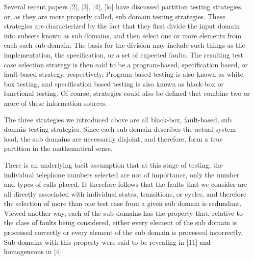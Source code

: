\documentclass[journal, twoside]{IEEEtran}
\begin{document}
Several recent papers [2], [3], [4], [lo] have discussed
partition testing strategies, or, as they are more properly
called, sub domain testing strategies. These strategies are characterized by the fact that they first divide the input domain into
subsets known as sub domains, and then select one or more
elements from each such sub domain. The basis for the division
may include such things as the implementation, the specification, or a set of expected faults. The resulting test case selection strategy is then said to be a program-based, specification based, or fault-based strategy, respectively. Program-based
testing is also known as white-box testing, and specification based testing is also known as black-box or functional testing.
Of course, strategies could also be defined that combine two or
more of these information sources.


The three strategies we introduced above are all black-box, \vspace{3cm}
fault-based, sub domain testing strategies. Since each sub domain describes the actual system load, the sub domains are
necessarily disjoint, and therefore, form a true partition in the
mathematical sense.

There is an underlying tacit assumption that at this stage of
testing, the individual telephone numbers selected are not of
importance, only the number and types of calls placed. It
therefore follows that the faults that we consider are all directly associated with individual states, transitions, or cycles,
and therefore the selection of more than one test case from a
given sub domain is redundant. Viewed another way, each of
the sub domains has the property that, relative to the class of
faults being considered, either every element of the sub domain
is processed correctly or every element of the sub domain is
processed incorrectly. Sub domains with this property were
said to be revealing in [11] and homogeneous in [4]. 
\end{document}
